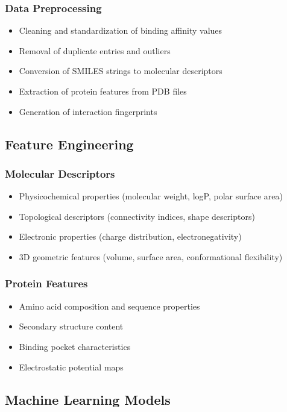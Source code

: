 \documentclass[12pt,a4paper]{article}
\begin{document}
\subsubsection{Data Preprocessing}
\begin{itemize}
    \item Cleaning and standardization of binding affinity values
    \item Removal of duplicate entries and outliers
    \item Conversion of SMILES strings to molecular descriptors
    \item Extraction of protein features from PDB files
    \item Generation of interaction fingerprints
\end{itemize}

\subsection{Feature Engineering}
\subsubsection{Molecular Descriptors}
\begin{itemize}
    \item Physicochemical properties (molecular weight, logP, polar surface area)
    \item Topological descriptors (connectivity indices, shape descriptors)
    \item Electronic properties (charge distribution, electronegativity)
    \item 3D geometric features (volume, surface area, conformational flexibility)
\end{itemize}

\subsubsection{Protein Features}
\begin{itemize}
    \item Amino acid composition and sequence properties
    \item Secondary structure content
    \item Binding pocket characteristics
    \item Electrostatic potential maps
\end{itemize}

\subsection{Machine Learning Models}
\end{document}
